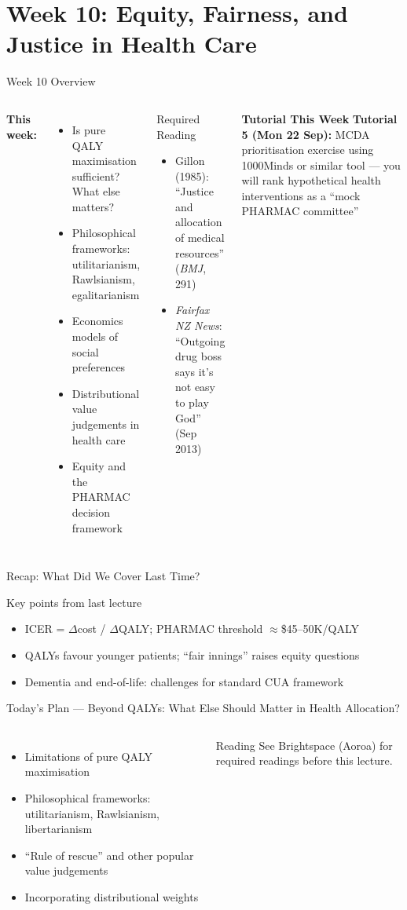 \documentclass[aspectratio=169, 12pt]{beamer}
\newcommand{\recapslide}[1]{%
  \begin{frame}{Recap: What Did We Cover Last Time?}
    \begin{block}{Key points from last lecture}
      \begin{itemize}#1\end{itemize}
    \end{block}
  \end{frame}}
\newcommand{\planslide}[2]{%
  \begin{frame}{Today's Plan — #1}
    \begin{columns}
      \column{0.6\textwidth}
      \begin{itemize}#2\end{itemize}
      \column{0.38\textwidth}
      \begin{alertblock}{Reading}
        \footnotesize See Brightspace (Aoroa) for required readings before this lecture.
      \end{alertblock}
    \end{columns}
  \end{frame}}
\newcommand{\tutorialbox}[1]{%
  \begin{block}{\textbf{Tutorial This Week}}
    #1
  \end{block}}
\begin{document}
\section{Week 10: Equity, Fairness, and Justice in Health Care}

\begin{frame}{Week 10 Overview}
  \begin{columns}
      \textbf{This week:}
      \begin{itemize}
        \item Is pure QALY maximisation sufficient? What else matters?
        \item Philosophical frameworks: utilitarianism, Rawlsianism, egalitarianism
        \item Economics models of social preferences
        \item Distributional value judgements in health care
        \item Equity and the PHARMAC decision framework
      \end{itemize}
      \begin{block}{Required Reading}
        {\small
        \begin{itemize}
          \item Gillon (1985): ``Justice and allocation of medical resources'' (\textit{BMJ}, 291)
          \item \textit{Fairfax NZ News}: ``Outgoing drug boss says it's not easy to play God'' (Sep 2013)
        \end{itemize}}
      \end{block}
      \vspace{0.2em}
      \tutorialbox{\textbf{Tutorial 5 (Mon 22 Sep):} MCDA prioritisation exercise using 1000Minds or similar tool --- you will rank hypothetical health interventions as a ``mock PHARMAC committee''}
  \end{columns}
\end{frame}

\recapslide{
  \item ICER = $\Delta$cost / $\Delta$QALY; PHARMAC threshold $\approx$\$45--50K/QALY
  \item QALYs favour younger patients; ``fair innings'' raises equity questions
  \item Dementia and end-of-life: challenges for standard CUA framework
}

\planslide{Beyond QALYs: What Else Should Matter in Health Allocation?}{
  \item Limitations of pure QALY maximisation
  \item Philosophical frameworks: utilitarianism, Rawlsianism, libertarianism
  \item ``Rule of rescue'' and other popular value judgements
  \item Incorporating distributional weights
}
\end{document}
